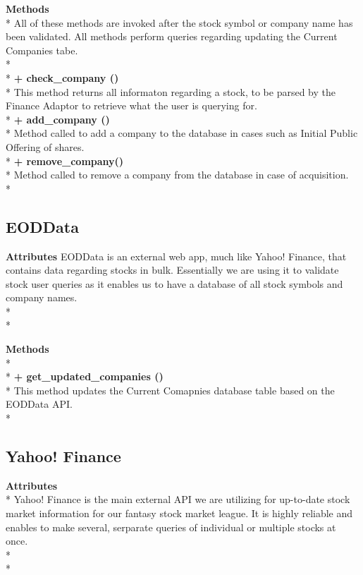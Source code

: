 {\bfseries Methods} \\*
All of these methods are invoked after the stock symbol or company name has been validated.
All methods perform queries regarding updating the Current Companies tabe. \\* \\* 
{\bfseries + check\_company () } \\*
	This method returns all informaton regarding a stock, to be parsed by the Finance Adaptor to
	retrieve what the user is querying for. \\*
{\bfseries + add\_company () } \\*
	Method called to add a company to the database in cases such as Initial Public Offering of
	shares. \\*
{\bfseries + remove\_company() } \\*
	Method called to remove a company from the database in case of acquisition. \\*

\subsection{EODData}
{\bfseries Attributes}  
EODData is an external web app, much like Yahoo! Finance, that contains data regarding stocks
in bulk. Essentially we are using it to validate stock user queries as it enables us to have a
database of all stock symbols and company names. \\* \\*

{\bfseries Methods} \\* \\*
{\bfseries + get\_updated\_companies ()} \\*
	This method updates the Current Comapnies database table based on the EODData API. \\*

\subsection{Yahoo! Finance} 
{\bfseries Attributes}  \\*
Yahoo! Finance is the main external API we are utilizing for up-to-date stock market information
for our fantasy stock market league. It is highly reliable and enables to make several, serparate
queries of individual or multiple stocks at once. \\* \\*

